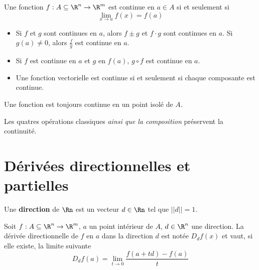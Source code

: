 \begin{mydef}[Continuité]
	Une fonction $f : A \subseteq \R^n \rightarrow \R^m$ est continue en $a \in A$ si et seulement si
	\[ \lim_{x \rightarrow a}f(x) = f(a) \]
\end{mydef}

\begin{myprop}\InsertTheoremBreak
	\begin{itemize}
		\item Si $f$ et $g$ sont continues en $a$, alors
			$f \pm g$ et $f \cdot g$ sont continues en $a$.
			Si $g(a) \neq 0$, alors $\frac{f}{g}$ est continue en $a$.

		\item Si $f$ est continue en $a$ et $g$ en $f(a)$,
			$g \circ f$ est continue en $a$.

		\item Une fonction vectorielle est continue si et seulement si chaque composante est continue.
	\end{itemize}
\end{myprop}

\begin{myrem}
	Une fonction est toujours continue en un point isolé de $A$.
\end{myrem}

\begin{myrem}
	Les quatres opérations classiques \emph{ainsi que la composition} préservent la continuité.
\end{myrem}



\section{Dérivées directionnelles et partielles}

\begin{mydef}
	Une \textbf{direction} de $\Rn$ est un vecteur $d \in \Rn$ tel que $||d|| = 1$.
\end{mydef}

\begin{mydef} Soit $f : A \subseteq \R^n \to \R^m$, $a$ un point intérieur de $A$, $d \in \R^n$ une direction. La dérivée directionnelle de $f$ en $a$ dans la direction $d$ est notée $D_df(x)$ et vaut, si elle existe, la limite suivante
	\[ D_df(a) = \lim_{t \to 0} \frac{f(a+td) - f(a)}{t} \]
\end{mydef}

